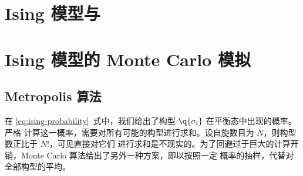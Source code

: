
\section{Ising 模型与 \AdSCFT{}}

\section{Ising 模型的 Monte Carlo 模拟}

\subsection{Metropolis 算法}

在 \eqref{eq:ising-probability}~式中，我们给出了构型 $\q{\sigma_i}$ 在平衡态中出现的概率。严格
计算这一概率，需要对所有可能的构型进行求和。设自旋数目为 $N$，则构型数正比于 $N!$，可见直接对它们
进行求和是不现实的。为了回避过于巨大的计算开销，Monte Carlo 算法给出了另外一种方案，即以按照一定
概率的抽样，代替对全部构型的平均。

